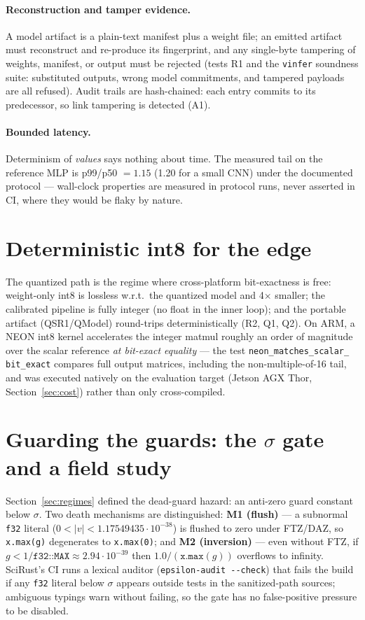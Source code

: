 \documentclass[sigconf,review]{acmart}
\begin{document}
\paragraph{Reconstruction and tamper evidence.}
A model artifact is a plain-text manifest plus a weight file; an emitted
artifact must reconstruct and re-produce its fingerprint, and any
single-byte tampering of weights, manifest, or output must be rejected
(tests R1 and the \texttt{vinfer} soundness suite: substituted outputs,
wrong model commitments, and tampered payloads are all refused). Audit
trails are hash-chained: each entry commits to its predecessor, so link
tampering is detected (A1).

\paragraph{Bounded latency.}
Determinism of \emph{values} says nothing about time. The measured tail on
the reference MLP is p99/p50 $= 1.15$ (1.20 for a small CNN) under the
documented protocol --- wall-clock properties are measured in protocol runs,
never asserted in CI, where they would be flaky by nature.

\section{Deterministic int8 for the edge}
\label{sec:int8}

The quantized path is the regime where cross-platform bit-exactness is
free: weight-only int8 is lossless w.r.t.\ the quantized model and
4$\times$ smaller; the calibrated pipeline is fully integer (no float in
the inner loop); and the portable artifact (QSR1/QModel) round-trips
deterministically (R2, Q1, Q2). On ARM, a NEON int8 kernel accelerates the
integer matmul roughly an order of magnitude over the scalar reference
\emph{at bit-exact equality} --- the test \texttt{neon\_matches\_scalar\_%
bit\_exact} compares full output matrices, including the non-multiple-of-16
tail, and was executed natively on the evaluation target (Jetson AGX Thor,
Section~\ref{sec:cost}) rather than only cross-compiled.

\section{Guarding the guards: the $\sigma$ gate and a field study}
\label{sec:guards}

Section~\ref{sec:regimes} defined the dead-guard hazard: an anti-zero guard
constant below $\sigma$. Two death mechanisms are distinguished:
\textbf{M1 (flush)} --- a subnormal \texttt{f32} literal
($0 < |v| < 1.17549435\cdot10^{-38}$) is flushed to zero under FTZ/DAZ, so
\texttt{x.max(g)} degenerates to \texttt{x.max(0)}; and \textbf{M2
(inversion)} --- even without FTZ, if $g < 1/\texttt{f32::MAX} \approx
2.94\cdot10^{-39}$ then $1.0/(\texttt{x.max}(g))$ overflows to infinity.
SciRust's CI runs a lexical auditor (\texttt{epsilon-audit -{}-check}) that
fails the build if any \texttt{f32} literal below $\sigma$ appears outside
tests in the sanitized-path sources; ambiguous typings warn without
failing, so the gate has no false-positive pressure to be disabled.
\end{document}
